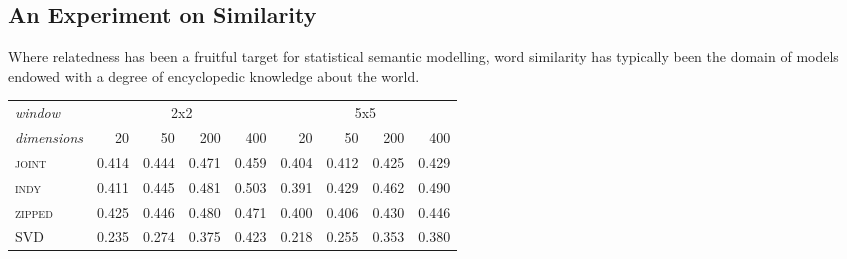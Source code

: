 \subsection{An Experiment on Similarity}
Where relatedness has been a fruitful target for statistical semantic modelling, word similarity has typically been the domain of models endowed with a degree of encyclopedic knowledge about the world.

\begin{table}
\centering
\begin{tabular}{lrrrrrrrr}
\hline
\emph{window} & \multicolumn{4}{c}{2x2} & \multicolumn{4}{c}{5x5} \\
\emph{dimensions} & 20 & 50 & 200 & 400 & 20 & 50 & 200 & 400 \\
\hline
\textsc{joint} & 0.414 & 0.444 & 0.471 & 0.459 & 0.404 & 0.412 & 0.425 & 0.429 \\
\textsc{indy} & 0.411 & 0.445 & 0.481 & 0.503 & 0.391 & 0.429 & 0.462 & 0.490 \\
\textsc{zipped} & 0.425 & 0.446 & 0.480 & 0.471 & 0.400 & 0.406 & 0.430 & 0.446 \\
\textsc{SVD} & 0.235 & 0.274 & 0.375 & 0.423 & 0.218 & 0.255 & 0.353 & 0.380 \\
\end{tabular}
\end{table}


